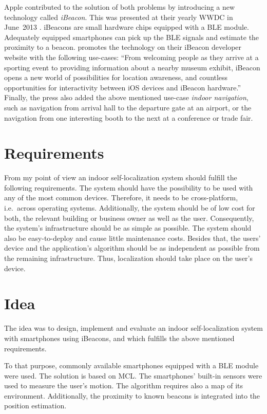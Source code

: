 Apple contributed to the solution of both problems by introducing a new technology called \emph{iBeacon}. This was presented at their yearly \ac{WWDC} in June~2013 \citep{apple:wwdc_2013_bruins}. iBeacons are small hardware chips equipped with a \ac{BLE} module. Adequately equipped smartphones can pick up the \ac{BLE} signals and estimate the proximity to a beacon. \citet{apple:ibeacon_site} promotes the technology on their iBeacon developer website with the following use-cases: ``From welcoming people as they arrive at a sporting event to providing information about a nearby museum exhibit, iBeacon opens a new world of possibilities for location awareness, and countless opportunities for interactivity between iOS devices and iBeacon hardware.'' Finally, the press also added the above mentioned use-case \emph{indoor navigation}, such as navigation from arrival hall to the departure gate at an airport, or the navigation from one interesting booth to the next at a conference or trade fair.


\section{Requirements}
From my point of view an indoor self-localization system should fulfill the following requirements. The system should have the possibility to be used with any of the most common devices. Therefore, it needs to be cross-platform, i.e.\ across operating systems. Additionally, the system should be of low cost for both, the relevant building or business owner as well as the user. Consequently, the system’s infrastructure should be as simple as possible. The system should also be easy-to-deploy and cause little maintenance costs. Besides that, the users’ device and the application's algorithm should be as independent as possible from the remaining infrastructure. Thus, localization should take place on the user’s device.


\section{Idea} %
The idea was to design, implement and evaluate an indoor self-localization system with smartphones using iBeacons, and which fulfills the above mentioned requirements.

To that purpose, commonly available smartphones equipped with a \acs{BLE} module were used. The solution is based on \ac{MCL}. The smartphones' built-in sensors were used to measure the user's motion. The algorithm requires also a map of its environment. Additionally, the proximity to known beacons is integrated into the position estimation.

